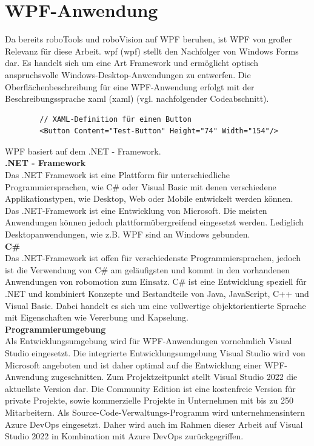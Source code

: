 \documentclass[ a4paper,
                oneside,
                toc=bibliography,
                toc=listof
                ]{scrbook}
\begin{document}
   	\section{WPF-Anwendung}
   	\label{sec:WPF}
   	Da bereits roboTools und roboVision auf WPF beruhen, ist WPF von großer Relevanz für diese Arbeit.
   	\ac{wpf} (\acl{wpf}) stellt den Nachfolger von Windows Forms dar. Es handelt sich um eine Art Framework und ermöglicht optisch anspruchsvolle Windows-Desktop-Anwendungen zu entwerfen. Die Oberflächenbeschreibung für eine WPF-Anwendung erfolgt mit der Beschreibungssprache \acs{xaml} (\acl{xaml}) (vgl. nachfolgender Codeabschnitt). \cite{kotz2022c}
   	\begin{lstlisting}
   		// XAML-Definition für einen Button
   		<Button Content="Test-Button" Height="74" Width="154"/>
   	\end{lstlisting}
   	WPF basiert auf dem .NET - Framework.\vspace{0.5\baselineskip}\\
   	\textbf{.NET - Framework}\\
   	Das .NET Framework ist eine Plattform für unterschiedliche Programmiersprachen, wie C\# oder Visual Basic  mit denen verschiedene Applikationstypen, wie Desktop, Web oder Mobile entwickelt werden können.\\
   	Das .NET-Framework ist eine Entwicklung von Microsoft. Die meisten Anwendungen können jedoch plattformübergreifend eingesetzt werden. Lediglich Desktopanwendungen, wie z.B. WPF sind an Windows gebunden.  \cite{kotz2022c} \cite{troelsen2022pro}\vspace{0.5\baselineskip}\\
   	\textbf{C\#}\\
   	Das .NET-Framework ist offen für verschiedenste Programmiersprachen, jedoch ist die Verwendung von C\# am geläufigsten und kommt in den vorhandenen Anwendungen von robomotion zum Einsatz. C\# ist eine Entwicklung speziell für .NET und kombiniert Konzepte und Bestandteile von Java, JavaScript, C++ und Visual Basic. Dabei handelt es sich um eine vollwertige objektorientierte Sprache mit Eigenschaften wie Vererbung und Kapselung. \cite{kotz2022c} \cite{troelsen2022pro}\vspace{0.5\baselineskip}\\
   	\textbf{Programmierumgebung}\\
   	Als Entwicklungsumgebung wird für WPF-Anwendungen vornehmlich Visual Studio eingesetzt. Die integrierte Entwicklungsumgebung Visual Studio wird von Microsoft angeboten und ist daher optimal auf die Entwicklung einer WPF-Anwendung zugeschnitten. Zum Projektzeitpunkt stellt Visual Studio 2022 die aktuellste Version dar. Die \glqq Community Edition\grqq{} ist eine kostenfreie Version für private Projekte, sowie kommerzielle Projekte in Unternehmen mit bis zu 250 Mitarbeitern. \cite{kotz2022c} Als Source-Code-Verwaltungs-Programm wird unternehmensintern \glqq Azure DevOps\grqq{} eingesetzt. Daher wird auch im Rahmen dieser Arbeit auf Visual Studio 2022 in Kombination mit Azure DevOps zurückgegriffen.\\
   	
\end{document}
